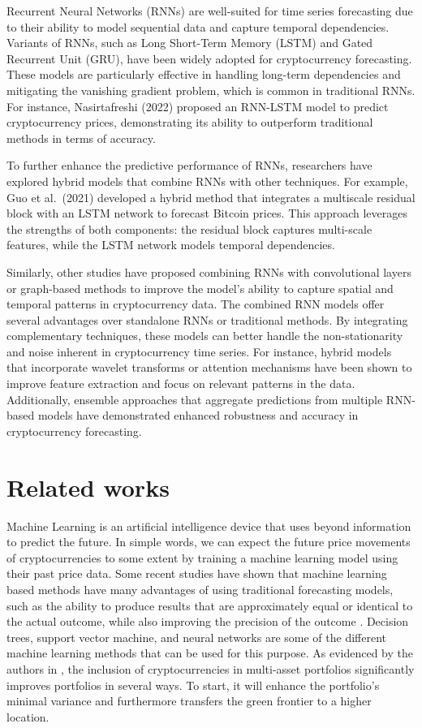 \documentclass[]{interact}
\theoremstyle{plain}%
\theoremstyle{definition}
\theoremstyle{remark}
\begin{document}
Recurrent Neural Networks (RNNs) are well-suited for time series
forecasting due to their ability to model sequential data and capture
temporal dependencies. Variants of RNNs, such as Long Short-Term Memory
(LSTM) and Gated Recurrent Unit (GRU), have been widely adopted for
cryptocurrency forecasting. These models are particularly effective in
handling long-term dependencies and mitigating the vanishing gradient
problem, which is common in traditional RNNs. For instance,
Nasirtafreshi (2022) proposed an RNN-LSTM model to predict
cryptocurrency prices, demonstrating its ability to outperform
traditional methods in terms of accuracy.

To further enhance the predictive performance of RNNs, researchers have
explored hybrid models that combine RNNs with other techniques. For
example, Guo et al.~(2021) developed a hybrid method that integrates a
multiscale residual block with an LSTM network to forecast Bitcoin
prices. This approach leverages the strengths of both components: the
residual block captures multi-scale features, while the LSTM network
models temporal dependencies.

Similarly, other studies have proposed combining RNNs with convolutional
layers or graph-based methods to improve the model's ability to capture
spatial and temporal patterns in cryptocurrency data. The combined RNN
models offer several advantages over standalone RNNs or traditional
methods. By integrating complementary techniques, these models can
better handle the non-stationarity and noise inherent in cryptocurrency
time series. For instance, hybrid models that incorporate wavelet
transforms or attention mechanisms have been shown to improve feature
extraction and focus on relevant patterns in the data. Additionally,
ensemble approaches that aggregate predictions from multiple RNN-based
models have demonstrated enhanced robustness and accuracy in
cryptocurrency forecasting.

\section{Related works}\label{related-works}

Machine Learning is an artificial intelligence device that uses beyond
information to predict the future. In simple words, we can expect the
future price movements of cryptocurrencies to some extent by training a
machine learning model using their past price data. Some recent studies
have shown that machine learning based methods have many advantages of
using traditional forecasting models, such as the ability to produce
results that are approximately equal or identical to the actual outcome,
while also improving the precision of the outcome \citep{hitam2021}.
Decision trees, support vector machine, and neural networks are some of
the different machine learning methods that can be used for this
purpose. As evidenced by the authors in \citep{andrianto17}, the
inclusion of cryptocurrencies in multi-asset portfolios significantly
improves portfolios in several ways. To start, it will enhance the
portfolio's minimal variance and furthermore transfers the green
frontier to a higher location.
\end{document}
